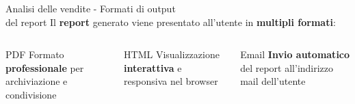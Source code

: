 \documentclass{beamer}
\begin{document}
	\begin{frame}{Analisi delle vendite - Formati di output\\ del report}
		Il \textbf{report} generato viene presentato all'utente in \textbf{multipli formati}:

		\begin{columns}
			\begin{column}{0.33\textwidth}
				\begin{alertblock}{PDF}
					Formato \textbf{professionale} per archiviazione e condivisione
				\end{alertblock}
			\end{column}
			\begin{column}{0.33\textwidth}
				\begin{exampleblock}{HTML}
					Visualizzazione \textbf{interattiva} e responsiva nel browser
				\end{exampleblock}
			\end{column}
			\begin{column}{0.33\textwidth}
				\begin{block}{Email}
					\textbf{Invio automatico} del report all'indirizzo mail dell'utente
				\end{block}
			\end{column}
		\end{columns}


\end{frame}
\end{document}
